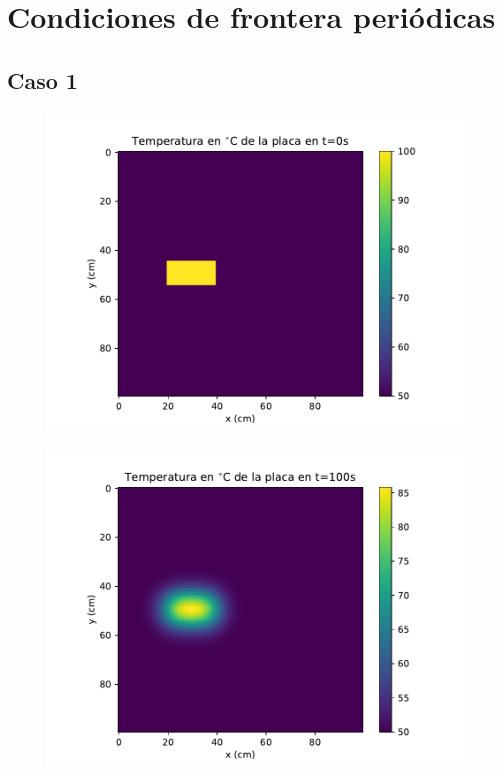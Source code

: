 \documentclass[12pt,letterpaper]{article}
\begin{document}
\section*{Condiciones de frontera periódicas}

\subsection*{Caso 1}

\begin{figure}[H]
\includegraphics{p1_0.pdf}
\centering
\end{figure}

\begin{figure}[H]
\includegraphics{p1_100.pdf}
\centering
\end{figure}
\end{document}
